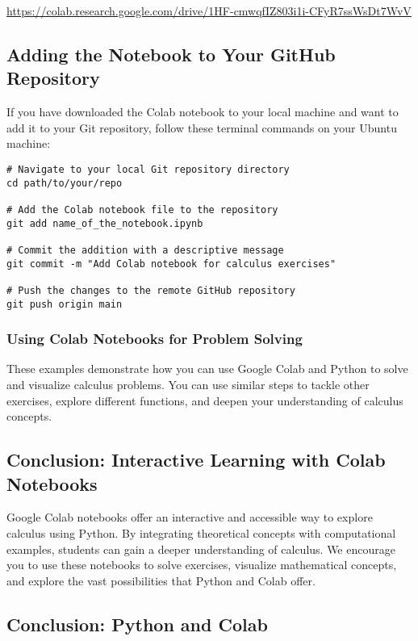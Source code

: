 \documentclass[a4paper,12pt]{book}
\newcounter{problem}
\newcounter{example}
\begin{document}
\url{https://colab.research.google.com/drive/1HF-cmwqfIZ803i1i-CFyR7ssWsDt7WvV}

\subsection*{Adding the Notebook to Your GitHub Repository}

If you have downloaded the Colab notebook to your local machine and want to add it to your Git repository, follow these terminal commands on your Ubuntu machine:

\begin{verbatim}
# Navigate to your local Git repository directory
cd path/to/your/repo

# Add the Colab notebook file to the repository
git add name_of_the_notebook.ipynb

# Commit the addition with a descriptive message
git commit -m "Add Colab notebook for calculus exercises"

# Push the changes to the remote GitHub repository
git push origin main
\end{verbatim}


\subsubsection*{Using Colab Notebooks for Problem Solving}
These examples demonstrate how you can use Google Colab and Python to solve and visualize calculus problems. You can use similar steps to tackle other exercises, explore different functions, and deepen your understanding of calculus concepts.

\subsection*{Conclusion: Interactive Learning with Colab Notebooks}

Google Colab notebooks offer an interactive and accessible way to explore calculus using Python. By integrating theoretical concepts with computational examples, students can gain a deeper understanding of calculus. We encourage you to use these notebooks to solve exercises, visualize mathematical concepts, and explore the vast possibilities that Python and Colab offer.


\subsection*{Conclusion: Python and Colab}
\end{document}
